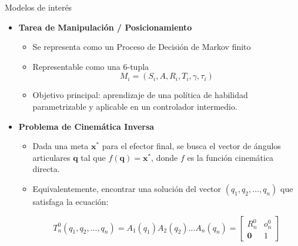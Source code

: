 \documentclass[spanish,10pt]{beamer}
\begin{document}
	\begin{frame}{Modelos de interés}
		\begin{itemize}
			\item \textbf{Tarea de Manipulación / Posicionamiento}
			\begin{itemize}
				\item Se representa como un Proceso de Decisión de Markov finito
				\item Representable como una 6-tupla $$M_i = (S_i, A, R_i, T_i, \gamma, \tau_i)$$
				\item Objetivo principal: aprendizaje de una política de habilidad parametrizable y aplicable en un controlador intermedio.
			\end{itemize}
			\item \textbf{Problema de Cinemática Inversa}
			\begin{itemize}
				\item Dada una meta $\mathbf{x}^*$ para el efector final, se busca el vector de ángulos articulares $\mathbf{q}$ tal que $f(\mathbf{q})=\mathbf{x}^*$, donde $f$ es la función cinemática directa.
				\item Equivalentemente, encontrar una solución del vector $(q_1, q_2, ..., q_n)$ que satisfaga la ecuación:
				
				$$
				T_n^0(q_1, q_2, ..., q_n) = A_1(q_1) A_2(q_2) ... A_n(q_n) = \begin{bmatrix}
					R_n^0 & o_n^0 \\
					\mathbf{0} & 1
				\end{bmatrix}
				$$
			\end{itemize}
		\end{itemize}
	\end{frame}
	
\end{document}
